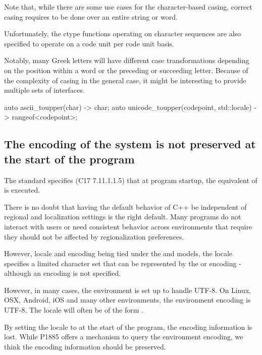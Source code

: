\documentclass{wg21}
\begin{document}
Note that, while there are some use cases for the character-based casing, correct casing requires to be done over an entire string or word.

Unfortunately, the ctype functions operating on character sequences are also specified to operate on a code unit per code unit basis.  

Notably, many Greek letters will have different case transformations depending on the position within a word or the preceding or succeeding letter.
Because of the complexity of casing in the general case, it might be interesting to provide multiple sets of interfaces.

\begin{codeblock}

auto ascii_toupper(char) -> char;
auto unicode_toupper(codepoint, std::locale) -> rangeof<codepoint>;

\end{codeblock}

\subsection{The encoding of the system is not preserved at the start of the program}

The \cite{C} standard specifies (C17 7.11.1.1.5) that
at program startup, the equivalent of  is executed.

There is no doubt that having the default behavior of C++ be independent of regional and localization settings is the right default.
Many programs do not interact with users or need consistent behavior across environments that require they should not be affected by regionalization preferences.

However, locale and encoding being tied under the  and  models,
the  locale specifies a limited character set that can be represented by the  or  encoding - although an encoding is not specified.

However, in many cases, the environment is set up to handle UTF-8.
On Linux, OSX, Android, iOS and many other environments, the environment encoding is UTF-8. The locale will often be of the form .

By setting the locale to  at the start of the program, the encoding information is lost.
While P1885 \cite{P1885R0} offers a mechanism to query the environment encoding, we think the encoding information should be preserved.
\end{document}
